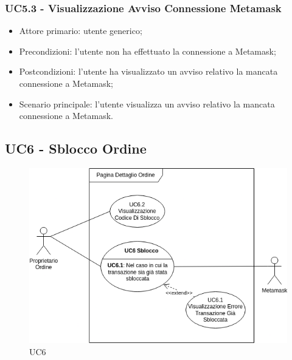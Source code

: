 \subsubsection{UC5.3 - Visualizzazione Avviso Connessione Metamask}

\begin{itemize}
    \item Attore primario: utente generico;
    \item Precondizioni: l'utente non ha effettuato la connessione a Metamask\glo{};
    \item Postcondizioni: l'utente ha visualizzato un avviso relativo la mancata connessione a Metamask\glo{};
    \item Scenario principale: l'utente visualizza un avviso relativo la mancata connessione a Metamask\glo{}.
\end{itemize}

\subsection{UC6 - Sblocco Ordine}

\begin{figure}[H]
    \centering
    \includegraphics[scale=0.7]{immagini/UC6.png}
    \caption{UC6}
\end{figure}

